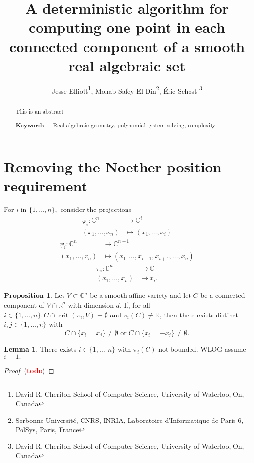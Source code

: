 \documentclass[11pt]{article}
\title{A deterministic algorithm for computing one point in each connected component of a smooth real algebraic set}
\author{Jesse Elliott\thanks{David R. Cheriton School of Computer Science, University of Waterloo, On, Canada}, Mohab Safey El Din\thanks{Sorbonne Universit\'e, CNRS, INRIA, Laboratoire d’Informatique de Paris 6, PolSys, Paris, France}, \'Eric Schost \thanks{David R. Cheriton School of Computer Science, University of Waterloo, On, Canada} 
}
\date{}
\theoremstyle{definition}
\newtheorem{proposition}{Proposition}
\newtheorem{lemma}{Lemma}
\newcommand{\C}{\mathbb{C}}
\newcommand{\R}{\mathbb{R}}
\newcommand{\vp}{\varphi}
\providecommand{\keywords}[1]
{
  \smallskip\noindent\small	
  \textbf{\textbf{Keywords---}} #1
}
\def\td{(\textcolor{red}{{\bf todo}})}
\def\td{(\textcolor{red}{{\bf todo}}) }
\DeclareMathOperator{\crit}{crit}
\begin{document}
\maketitle




\begin{abstract}
This is an abstract \newline
\keywords{Real algebraic geometry, polynomial system solving, complexity}
\end{abstract}


\newpage 




\section{Removing the Noether position requirement}
For $i$ in
$\{1,\dots,n\},$ consider the projections
\begin{align*}
    \vp_i: \C^n  &\rightarrow \C^i \\
    (x_1,\hdots,x_n) &\mapsto  (x_1,\hdots,x_i)    
\end{align*}
\begin{align*}
    \psi_i: \C^n  &\rightarrow \C^{n-1} \\
    (x_1,\hdots,x_n) &\mapsto  (x_1,\hdots,x_{i-1},x_{i+1},\hdots,x_n)    
\end{align*}
\begin{align*}
    \pi_i: \C^n  &\rightarrow \C \\
    (x_1,\hdots,x_n) &\mapsto x_i.
\end{align*}
%
\begin{proposition}\label{prop:main}
    Let $V \subset \C^n$ be a smooth affine variety and let $C$ be a connected component of $V \cap \R^n$ with dimension $d$. If, for all $i \in \{1,\hdots,n\}, C \cap \crit(\pi_i,V) = \emptyset$  and  $\pi_i(C) \not = \R$, then there exists distinct $i,j \in\{1,\hdots,n\}$ with
    \[
C \cap \{ x_i= x_j\} \not = \emptyset \textrm{ or }
C \cap \{ x_i= -x_j\} \not = \emptyset. 
    \]
\end{proposition}
%
\begin{lemma}
    There exists $i \in \{1,\hdots,n\}$ with $\pi_i(C)$ not bounded. WLOG assume $i=1.$
\end{lemma}
\begin{proof}
    \td
\end{proof}
\end{document}
